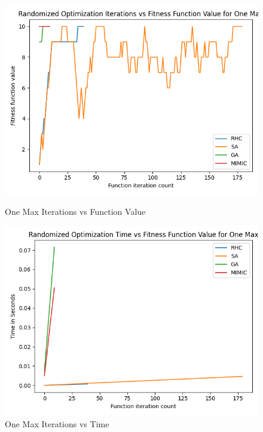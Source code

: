 \documentclass[11pt]{article}
\begin{document}
    \begin{figure}
        \begin{minipage}{0.5\textwidth}
            \centering
            \includegraphics[width=.9\linewidth]{onemax1.png}
            \caption{One Max Iterations vs Function Value}\label{Fig:One Max Iterations vs Function Value}
        \end{minipage}\hfill
        \begin{minipage}{0.5\textwidth}
            \centering
            \includegraphics[width=.9\linewidth]{onemax2.png}
            \caption{One Max Iterations vs Time}\label{Fig:One Max Iterations vs Time}
        \end{minipage}
    \end{figure}
\end{document}
